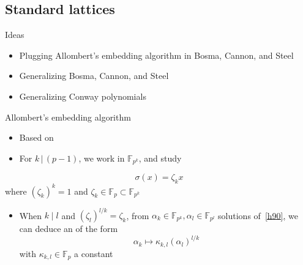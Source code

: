 \documentclass[xcolor=x11names,compress, aspectratio=43]{beamer}
\begin{document}
\subsection{Standard lattices}
\begin{frame}{Ideas}
  \begin{itemize}
    \item Plugging Allombert's embedding algorithm in Bosma, Cannon, and Steel
    \item Generalizing Bosma, Cannon, and Steel
    \item Generalizing Conway polynomials
  \end{itemize}
  \begin{center}
  \end{center}
\end{frame}

\begin{frame}{Allombert's embedding algorithm}
  \begin{itemize}
    \item Based on 
    \item For $k\,|\,(p-1)$, we work in $\mathbb{F}_{p^k}$, and
      study
  \end{itemize}
      \begin{equation}
        \tag{H90}
        \sigma(x) = \zeta_k x
        \label{h90}
      \end{equation}
      where $(\zeta_k)^k = 1$ and
      $\zeta_k\in\mathbb{F}_{p}\subset\mathbb{F}_{p^k}$
      \begin{itemize}
        \item When $k\mid l$ and $(\zeta_l)^{l/k}=\zeta_k$, from $\alpha_k\in\mathbb{F}_{p^{k}},
          \alpha_l\in\mathbb{F}_{p^{l}}$ solutions of~\eqref{h90}, we
          can deduce an  of the form
          \[
            \alpha_k\mapsto\kappa_{k, l}(\alpha_l)^{l/k}
          \]
          with $\kappa_{k, l}\in\mathbb{F}_p$ a constant
      \end{itemize}
\end{frame}
\end{document}
